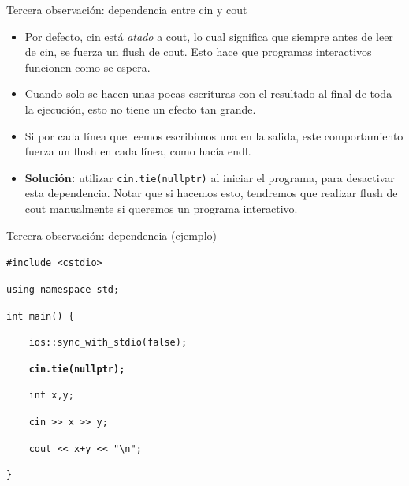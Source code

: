 \documentclass{beamer}
\begin{document}
  
  \begin{frame}{Tercera observación: dependencia entre cin y cout}
  
    \begin{itemize}
        \item Por defecto, cin está \textit{atado} a cout, lo cual significa que siempre antes de leer de cin, se fuerza un flush de cout. Esto hace que programas interactivos funcionen como se espera.
        \item Cuando solo se hacen unas pocas escrituras con el resultado al final de toda la ejecución, esto no tiene un efecto tan grande.
        \item Si por cada línea que leemos escribimos una en la salida, este comportamiento fuerza un flush en cada línea, como hacía endl.
        \item \textbf{Solución:} utilizar \texttt{cin.tie(nullptr)} al iniciar el programa, para desactivar esta dependencia. Notar que si hacemos esto, tendremos que realizar flush de cout manualmente si queremos un programa interactivo.
    \end{itemize}
    
  \end{frame}
  
  \begin{frame}{Tercera observación: dependencia (ejemplo)}
        
  \texttt{\#include <cstdio>}
  
  \texttt{using namespace std;}
  
  \texttt{int main() \{}
  
  \texttt{    \ \ \ ios::sync\_with\_stdio(false);}
  
  \textbf{\texttt{    \ \ \ cin.tie(nullptr);}}
  
  \texttt{    \ \ \ int x,y;}
      
  \texttt{    \ \ \ cin >{}> x >{}> y;}
      
  \texttt{    \ \ \ cout <{}< x+y <{}< "\textbackslash n";}
      
  \texttt{\}}
  
  \end{frame}
  
\end{document}
